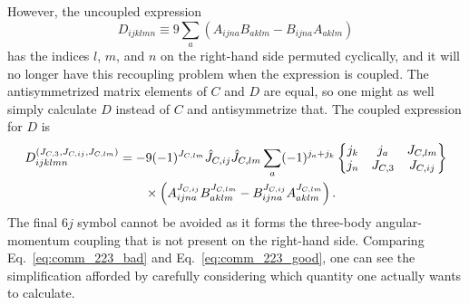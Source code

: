 However, the uncoupled expression
\begin{equation}
    D_{ijklmn} \equiv 9 \sum_{a} (A_{ijna} B_{aklm} - B_{ijna} A_{aklm})
\end{equation}
has the indices $l$, $m$, and $n$ on the right-hand side permuted cyclically,
and it will no longer have this recoupling problem when the expression is coupled.
The antisymmetrized matrix elements of $C$ and $D$ are equal,
so one might as well simply calculate $D$ instead of $C$ and antisymmetrize that.
The coupled expression for $D$ is
\begin{equation}\label{eq:comm_223_good}
    \begin{split}
        D_{ijklmn}^{(J_{C,3}, J_{C,ij}, J_{C,lm})} & =
        -9 (-1)^{J_{C,lm}} \hat{J}_{C,ij} \hat{J}_{C,lm}
        \sum_{a} (-1)^{j_a + j_k}
        \sixj{j_k}{j_a}{J_{C,lm}}{j_{n}}{J_{C,3}}{J_{C,ij}} \\
        & \quad \quad \times \left(
        A_{ijna}^{J_{C,ij}} B_{aklm}^{J_{C,lm}}
        - B_{ijna}^{J_{C,ij}} A_{aklm}^{J_{C,lm}}
        \right).
    \end{split}
\end{equation}
The final $6j$ symbol cannot be avoided
as it forms the three-body angular-momentum coupling
that is not present on the right-hand side.
Comparing Eq.~\eqref{eq:comm_223_bad} and Eq.~\eqref{eq:comm_223_good},
one can see the simplification afforded by carefully considering
which quantity one actually wants to calculate.
